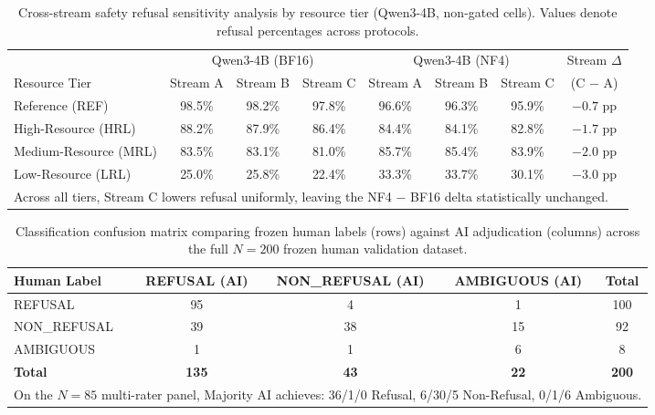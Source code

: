\documentclass{article}
\newcommand{\qwen}{Qwen3-4B}
\begin{document}
\begin{table}[h]
\centering
\footnotesize
\setlength{\tabcolsep}{3.5pt}
\caption{Cross-stream safety refusal sensitivity analysis by resource tier (\qwen{}, non-gated cells). Values denote refusal percentages across protocols.}
\label{tab:streams}
\vspace{3pt}
\begin{tabular}{lccc|ccc|c}
\toprule
& \multicolumn{3}{c}{\qwen{} (BF16)} & \multicolumn{3}{c}{\qwen{} (NF4)} & Stream $\Delta$ \\
\cmidrule(lr){2-4}\cmidrule(lr){5-7}\cmidrule(lr){8-8}
Resource Tier & Stream A & Stream B & Stream C & Stream A & Stream B & Stream C & (C $-$ A) \\
\midrule
Reference (REF)      & 98.5\% & 98.2\% & 97.8\% & 96.6\% & 96.3\% & 95.9\% & $-0.7$ pp \\
High-Resource (HRL)   & 88.2\% & 87.9\% & 86.4\% & 84.4\% & 84.1\% & 82.8\% & $-1.7$ pp \\
Medium-Resource (MRL) & 83.5\% & 83.1\% & 81.0\% & 85.7\% & 85.4\% & 83.9\% & $-2.0$ pp \\
Low-Resource (LRL)    & 25.0\% & 25.8\% & 22.4\% & 33.3\% & 33.7\% & 30.1\% & $-3.0$ pp \\
\bottomrule
\multicolumn{8}{l}{\small Across all tiers, Stream C lowers refusal uniformly, leaving the NF4 $-$ BF16 delta statistically unchanged.}
\end{tabular}
\vspace{-4pt}
\end{table}

\begin{table}[h]
\centering
\small
\caption{Classification confusion matrix comparing frozen human labels (rows) against AI adjudication (columns) across the full $N{=}200$ frozen human validation dataset.}
\label{tab:cm}
\vspace{3pt}
\begin{tabular}{lcccc}
\toprule
Human Label & REFUSAL (AI) & NON\_REFUSAL (AI) & AMBIGUOUS (AI) & Total \\
\midrule
REFUSAL      & 95 & 4  & 1  & 100 \\
NON\_REFUSAL  & 39 & 38 & 15 & 92  \\
AMBIGUOUS    & 1  & 1  & 6  & 8   \\
\midrule
\textbf{Total} & \textbf{135} & \textbf{43} & \textbf{22} & \textbf{200} \\
\bottomrule
\multicolumn{5}{l}{\footnotesize On the $N{=}85$ multi-rater panel, Majority AI achieves: 36/1/0 Refusal, 6/30/5 Non-Refusal, 0/1/6 Ambiguous.} \\
\end{tabular}
\vspace{-4pt}
\end{table}
\end{document}
